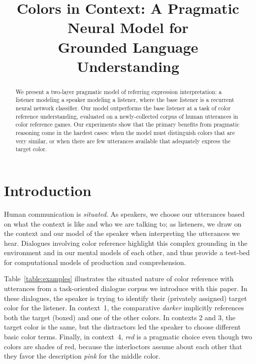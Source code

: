 \documentclass[11pt,letterpaper]{article}
\title{Colors in Context: A Pragmatic Neural Model for \\
Grounded Language Understanding}
\author{}
\date{}
\newcommand{\word}{\textit}
\renewcommand{\|}{\mid}
\newcommand{\Tabref}[1]{Table~\ref{#1}}
\begin{document}
\maketitle
\begin{abstract}


We present a two-layer pragmatic model of referring expression interpretation:
a listener modeling a speaker modeling a listener, where the base listener is a
recurrent neural network classifier. Our model outperforms the
base listener at a task of color reference understanding, evaluated on a
newly-collected corpus of human utterances in color reference games.
Our experiments show that the primary benefits from pragmatic reasoning come
in the hardest cases: when the model must distinguish colors that are very
similar, or when there are few utterances available that adequately express
the target color.

\end{abstract}

\section{Introduction}


Human communication is \emph{situated}. As speakers, we choose our
utterances based on what the context is like and who we are talking
to; as listeners, we draw on the context and our model of the speaker
when interpreting the utterances we hear. Dialogues involving color
reference highlight this complex grounding in the environment and in
our mental models of each other, and thus provide a test-bed for
computational models of production and comprehension.

\Tabref{table:examples} illustrates the situated nature of color
reference with utterances from a task-oriented dialogue corpus we
introduce with this paper. In these dialogues, the speaker is trying
to identify their (privately assigned) target color for the
listener. In context~1, the comparative \word{darker} implicitly
references both the target (boxed) and one of the other colors. In
contexts 2 and 3, the target color is the same, but the distractors
led the speaker to choose different basic color terms. Finally, in
context~4, \word{red} is a pragmatic choice even though two colors are
shades of red, because the interloctors assume about each other that
they favor the description \word{pink} for the middle color.
\end{document}
